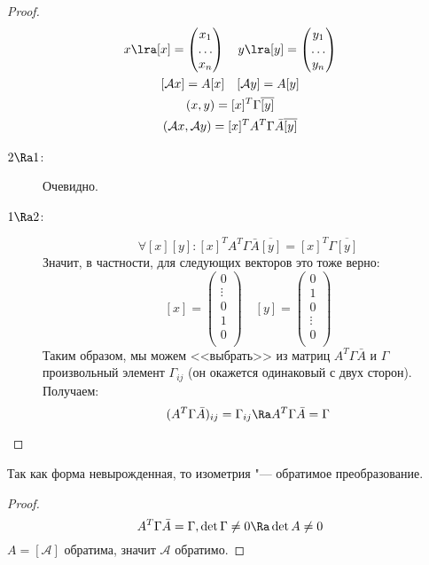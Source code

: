 \begin{proof}
	\begin{gather*}
		x \lra [x] = \begin{pmatrix} x_1\\ \dots\\ x_n\\ \end{pmatrix} \quad
		y \lra [y] = \begin{pmatrix} y_1\\ \dots\\ y_n\\ \end{pmatrix} \\
		[\mathcal A x] = A[x] \quad
		[\mathcal A y] = A[y] \\
		(x, y) = [x]^T \Gamma \overline{[y]} \\
		(\mathcal A x, \mathcal A y) = [x]^T A^T \Gamma \bar A  \overline{[y]}
	\end{gather*}
	\begin{description}
	\item[$2 \Ra 1$:]
		Очевидно.

	\item[$1 \Ra 2$:]
		\[
			\forall [x][y]\colon [x]^T A^T \Gamma\bar A \overline{[y]} = [x]^T  \Gamma \overline{[y]}
		\]
		Значит, в частности, для следующих векторов это тоже верно:
		\[
			[x] = \begin{pmatrix} 0 \\ \vdots \\ 0 \\ 1\\ 0 \\ \end{pmatrix} \quad
			[y] = \begin{pmatrix} 0\\ 1\\ 0\\ \vdots \\ 0\\ \end{pmatrix}
		\]
		Таким образом, мы можем <<выбрать>> из матриц $A^T \Gamma \bar A$ и $\Gamma$ произвольный элемент $\Gamma_{ij}$ (он окажется одинаковый с двух сторон).
		Получаем:
		\[
			(A^T \Gamma \bar A )_{ij} = \Gamma_{ij} \Ra A^T \Gamma \bar A  = \Gamma
		\]
	\end{description}
\end{proof}

\begin{conseq}
	Так как форма невырожденная, то изометрия "--- обратимое преобразование.
\end{conseq}
\begin{proof}
	\[ A^T \Gamma \bar A  = \Gamma, \det \Gamma \ne 0 \Ra \det A \ne 0 \]
	$A = [\mathcal A]$ обратима, значит $\mathcal A$ обратимо.
\end{proof}

